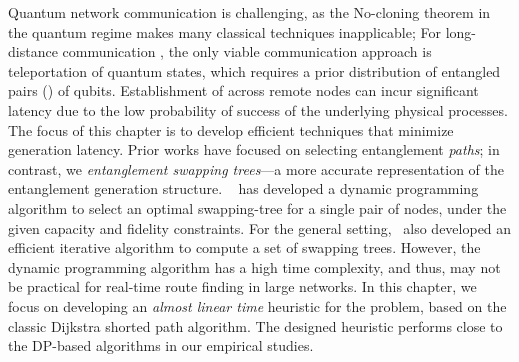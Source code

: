 Quantum network communication is 
challenging, as the No-cloning theorem in the quantum regime
makes many classical techniques inapplicable; 
For long-distance communication , 
the only viable communication approach  is 
teleportation of quantum states, which requires a prior distribution of 
entangled pairs (\epss) of qubits.
Establishment of \epss across remote nodes can incur significant 
latency due to the low probability of success of the underlying 
physical processes. 
The focus of this chapter is to develop
efficient techniques that minimize \eps generation latency. Prior works
have focused on selecting entanglement \textit{paths}; in contrast, we   \emph{entanglement swapping trees}---a more accurate 
representation of the entanglement generation structure. 
~\cite{swapping-tqe-22} has developed a dynamic programming algorithm 
to select an optimal swapping-tree for a single pair of nodes, under the given capacity
and fidelity constraints. For the general setting,~\cite{swapping-tqe-22} also developed an 
efficient iterative algorithm to compute a set of swapping trees.
However, the dynamic programming algorithm has a high time complexity, and thus, may not
be practical for real-time route finding in large networks.
In this chapter, we focus on developing an \emph{almost linear time} heuristic for the \spp problem,
based on the classic Dijkstra shorted path algorithm.
The designed heuristic performs close to the DP-based algorithms in our empirical studies.